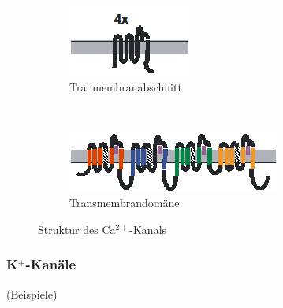 \documentclass[10pt,a4paper]{report}
\begin{document}
\begin{figure}[h]
    \centering
    \begin{subfigure}[b]{0.3\textwidth}
        \includegraphics[width=\textwidth]{Bilder/transmembranca.png}
        \caption{Tranmembranabschnitt}
        \label{fig:transmembranna}
    \end{subfigure}
    ~ %
    \begin{subfigure}[b]{0.5\textwidth}
        \includegraphics[width=\textwidth]{Bilder/kanalaufbau2.png}
        \caption{Transmembrandomäne}
        \label{fig:transmebrandomaene}
    \end{subfigure}
    \caption{Struktur des Ca$^{2+}$-Kanals}
    \label{fig:struktur_ca_kanal}
\end{figure}

\subsubsection{K$^+$-Kanäle} 
(Beispiele)
\end{document}
